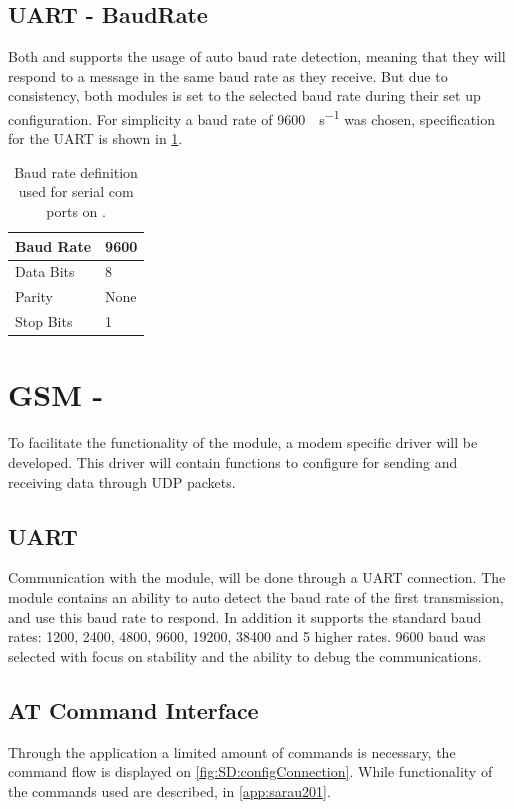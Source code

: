 \subsection{UART - BaudRate}
Both \SARA and \GPS supports the usage of auto baud rate detection, meaning that they will respond to a message in the same baud rate as they receive.
But due to consistency, both modules is set to the selected baud rate during their set up configuration. 
For simplicity a baud rate of \SI[per-mode = symbol]{9600}{\bit\per\second} was chosen, specification for the UART is shown in \cref{tab:BaudRate}.

\begin{table}[H]
	\begin{tabular}{ll}
		\hline 
		Baud Rate & 9600 \\ 
		\hline 
		Data Bits & 8 \\ 
		\hline 
		Parity & None \\ 
		\hline 
		Stop Bits & 1 \\ 
		\hline 
	\end{tabular}
	\centering
	\caption{Baud rate definition used for serial com ports on \SAMD.}
	\label{tab:BaudRate}
\end{table}

\section{GSM - \SARA}
To facilitate the functionality of the \SARA module, a modem specific driver will be developed. This driver will contain functions to configure \SARA for sending and receiving data through UDP packets.

\subsection{UART}
Communication with the \SARA module, will be done through a UART connection. The module contains an ability to auto detect the baud rate of the first transmission, and use this baud rate to respond. In addition it supports the standard baud rates: \num{1200}, \num{2400}, \num{4800}, \num{9600}, \num{19200}, \num{38400} and 5 higher rates. \num{9600} baud was selected with focus on stability and the ability to debug the communications.

\subsection{AT Command Interface}
Through the application a limited amount of commands is necessary, the command flow is displayed on \cref{fig:SD:configConnection}. While functionality of the commands used are described, in \cref{app:sarau201}.

